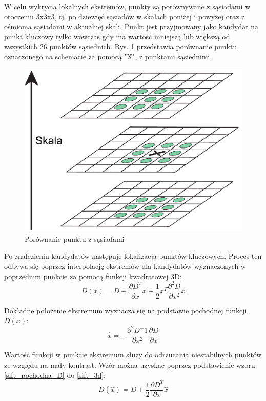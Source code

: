 W celu wykrycia lokalnych ekstremów, punkty są porównywane z sąsiadami w otoczeniu 3x3x3, tj. po dziewięć sąsiadów w skalach poniżej i powyżej oraz z ośmioma sąsiadami w aktualnej skali. Punkt jest przyjmowany jako kandydat na punkt kluczowy tylko wówczas gdy ma wartość mniejszą lub większą od wszystkich 26 punktów sąsiednich.\cite{LOWE04} Rys. \ref{fig:sift-gaussian-min-max} przedstawia porównanie punktu, oznaczonego na schemacie za pomocą "X", z punktami sąsiednimi.

\begin{figure}[h]
	\centering
	\includegraphics[scale=0.4]{graphics/01_podstawy_teoretyczne/sift-gaussian-min-max.pdf}
	\caption{Porównanie punktu z sąsiadami \cite{LOWE04}}
	\label{fig:sift-gaussian-min-max}
\end{figure}

Po znalezieniu kandydatów następuje lokalizacja punktów kluczowych. Proces ten odbywa się poprzez interpolację ekstremów dla kandydatów wyznaczonych w poprzednim punkcie za pomocą funkcji kwadratowej 3D:
\begin{equation} 
\label{sift_3d} 
D(x) = D + \frac{\partial D^T}{\partial x} x + \frac{1}{2}x^T \frac{\partial^2 D}{\partial x^2} x
\end{equation}

Dokładne położenie ekstremum wyznacza się na podstawie pochodnej funkcji $D(x)$:
\begin{equation} 
\label{sift_pochodna_D} 
\hat{x} = -\frac{\partial^2 D^-1}{\partial x^2}\frac{\partial D}{\partial x}
\end{equation}

Wartość funkcji w punkcie ekstremum służy do odrzucania niestabilnych punktów ze względu na mały kontrast. Wzór można uzyskać poprzez podstawienie wzoru \ref{sift_pochodna_D} do \ref{sift_3d}:
\begin{equation} 
\label{sift_Dx} 
D(\hat{x}) = D + \frac{1}{2} \frac{\partial D^T}{\partial x} \hat{x}
\end{equation}

